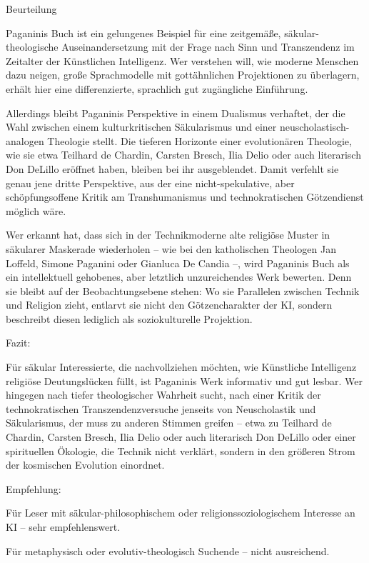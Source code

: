 \documentclass[
]{article}
\begin{document}
Beurteilung

Paganinis Buch ist ein gelungenes Beispiel für eine zeitgemäße, säkular-theologische Auseinandersetzung mit der Frage nach Sinn und Transzendenz im Zeitalter der Künstlichen Intelligenz. Wer verstehen will, wie moderne Menschen dazu neigen, große Sprachmodelle mit gottähnlichen Projektionen zu überlagern, erhält hier eine differenzierte, sprachlich gut zugängliche Einführung.

Allerdings bleibt Paganinis Perspektive in einem Dualismus verhaftet, der die Wahl zwischen einem kulturkritischen Säkularismus und einer neuscholastisch-analogen Theologie stellt. Die tieferen Horizonte einer evolutionären Theologie, wie sie etwa Teilhard de Chardin, Carsten Bresch, Ilia Delio oder auch literarisch Don DeLillo eröffnet haben, bleiben bei ihr ausgeblendet. Damit verfehlt sie genau jene dritte Perspektive, aus der eine nicht-spekulative, aber schöpfungsoffene Kritik am Transhumanismus und technokratischen Götzendienst möglich wäre.

Wer erkannt hat, dass sich in der Technikmoderne alte religiöse Muster in säkularer Maskerade wiederholen -- wie bei den katholischen Theologen Jan Loffeld, Simone Paganini oder Gianluca De Candia --, wird Paganinis Buch als ein intellektuell gehobenes, aber letztlich unzureichendes Werk bewerten. Denn sie bleibt auf der Beobachtungsebene stehen: Wo sie Parallelen zwischen Technik und Religion zieht, entlarvt sie nicht den Götzencharakter der KI, sondern beschreibt diesen lediglich als soziokulturelle Projektion.

Fazit:

Für säkular Interessierte, die nachvollziehen möchten, wie Künstliche Intelligenz religiöse Deutungslücken füllt, ist Paganinis Werk informativ und gut lesbar. Wer hingegen nach tiefer theologischer Wahrheit sucht, nach einer Kritik der technokratischen Transzendenzversuche jenseits von Neuscholastik und Säkularismus, der muss zu anderen Stimmen greifen -- etwa zu Teilhard de Chardin, Carsten Bresch, Ilia Delio oder auch literarisch Don DeLillo oder einer spirituellen Ökologie, die Technik nicht verklärt, sondern in den größeren Strom der kosmischen Evolution einordnet.

Empfehlung:

Für Leser mit säkular-philosophischem oder religionssoziologischem Interesse an KI -- sehr empfehlenswert.

Für metaphysisch oder evolutiv-theologisch Suchende -- nicht ausreichend.
\end{document}
